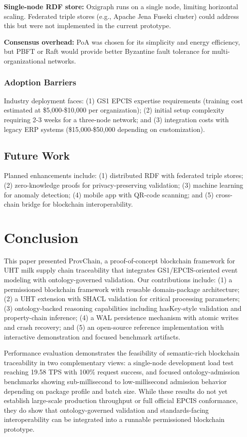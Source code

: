 \documentclass[preprint,review,12pt,authoryear]{elsarticle}
\begin{document}
\textbf{Single-node RDF store:} Oxigraph runs on a single node, limiting horizontal scaling. Federated triple stores (e.g., Apache Jena Fuseki cluster) could address this but were not implemented in the current prototype.

\textbf{Consensus overhead:} PoA was chosen for its simplicity and energy efficiency, but PBFT or Raft would provide better Byzantine fault tolerance for multi-organizational networks.

\subsubsection{Adoption Barriers}

Industry deployment faces: (1) GS1 EPCIS expertise requirements (training cost estimated at \$5,000-\$10,000 per organization); (2) initial setup complexity requiring 2-3 weeks for a three-node network; and (3) integration costs with legacy ERP systems (\$15,000-\$50,000 depending on customization).

\subsection{Future Work}

Planned enhancements include: (1) distributed RDF with federated triple stores; (2) zero-knowledge proofs for privacy-preserving validation; (3) machine learning for anomaly detection; (4) mobile app with QR-code scanning; and (5) cross-chain bridge for blockchain interoperability.

\section{Conclusion}\label{sec:conclusion}

This paper presented ProvChain, a proof-of-concept blockchain framework for UHT milk supply chain traceability that integrates GS1/EPCIS-oriented event modeling with ontology-governed validation. Our contributions include: (1) a permissioned blockchain framework with reusable domain-package architecture; (2) a UHT extension with SHACL validation for critical processing parameters; (3) ontology-backed reasoning capabilities including hasKey-style validation and property-chain inference; (4) a WAL persistence mechanism with atomic writes and crash recovery; and (5) an open-source reference implementation with interactive demonstration and focused benchmark artifacts.

Performance evaluation demonstrates the feasibility of semantic-rich blockchain traceability in two complementary views: a single-node development load test reaching 19.58 TPS with 100\% request success, and focused ontology-admission benchmarks showing sub-millisecond to low-millisecond admission behavior depending on package profile and batch size. While these results do not yet establish large-scale production throughput or full official EPCIS conformance, they do show that ontology-governed validation and standards-facing interoperability can be integrated into a runnable permissioned blockchain prototype.
\end{document}
